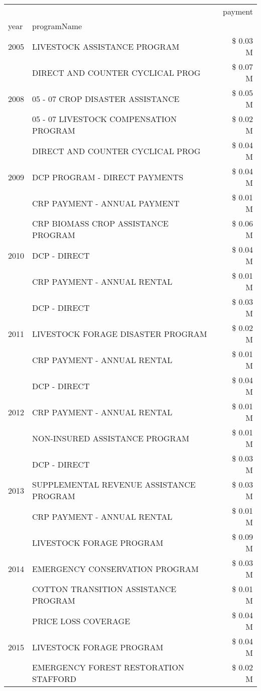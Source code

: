 \begin{tabular}{llr}
\toprule
 &  & payment \\
year & programName &  \\
\midrule
2005 & LIVESTOCK ASSISTANCE PROGRAM & \$ 0.03 M \\
\cline{1-3}
\multirow[t]{3}{*}{2008} & DIRECT AND COUNTER CYCLICAL PROG & \$ 0.07 M \\
 & 05 - 07 CROP DISASTER ASSISTANCE & \$ 0.05 M \\
 & 05 - 07 LIVESTOCK COMPENSATION PROGRAM & \$ 0.02 M \\
\cline{1-3}
\multirow[t]{3}{*}{2009} & DIRECT AND COUNTER CYCLICAL PROG & \$ 0.04 M \\
 & DCP PROGRAM - DIRECT PAYMENTS & \$ 0.04 M \\
 & CRP PAYMENT - ANNUAL PAYMENT & \$ 0.01 M \\
\cline{1-3}
\multirow[t]{3}{*}{2010} & CRP BIOMASS CROP ASSISTANCE PROGRAM & \$ 0.06 M \\
 & DCP - DIRECT & \$ 0.04 M \\
 & CRP PAYMENT - ANNUAL RENTAL & \$ 0.01 M \\
\cline{1-3}
\multirow[t]{3}{*}{2011} & DCP - DIRECT & \$ 0.03 M \\
 & LIVESTOCK FORAGE DISASTER PROGRAM & \$ 0.02 M \\
 & CRP PAYMENT - ANNUAL RENTAL & \$ 0.01 M \\
\cline{1-3}
\multirow[t]{3}{*}{2012} & DCP - DIRECT & \$ 0.04 M \\
 & CRP PAYMENT - ANNUAL RENTAL & \$ 0.01 M \\
 & NON-INSURED ASSISTANCE PROGRAM & \$ 0.01 M \\
\cline{1-3}
\multirow[t]{3}{*}{2013} & DCP - DIRECT & \$ 0.03 M \\
 & SUPPLEMENTAL REVENUE ASSISTANCE PROGRAM & \$ 0.03 M \\
 & CRP PAYMENT - ANNUAL RENTAL & \$ 0.01 M \\
\cline{1-3}
\multirow[t]{3}{*}{2014} & LIVESTOCK FORAGE PROGRAM & \$ 0.09 M \\
 & EMERGENCY CONSERVATION PROGRAM & \$ 0.03 M \\
 & COTTON TRANSITION ASSISTANCE PROGRAM & \$ 0.01 M \\
\cline{1-3}
\multirow[t]{3}{*}{2015} & PRICE LOSS COVERAGE & \$ 0.04 M \\
 & LIVESTOCK FORAGE PROGRAM & \$ 0.04 M \\
 & EMERGENCY FOREST RESTORATION STAFFORD & \$ 0.02 M \\

\end{tabular}
